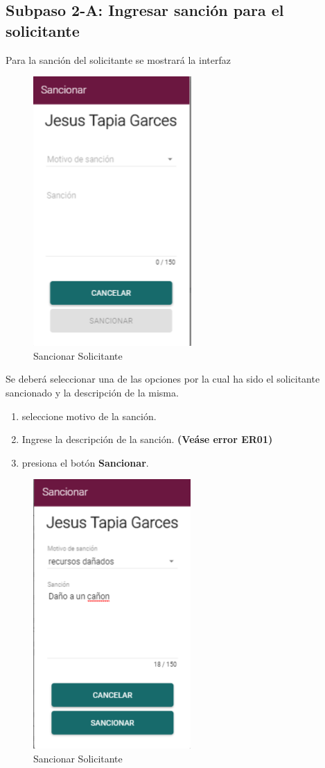 \subsection{Subpaso 2-A: Ingresar sanción para el solicitante}	
	Para la sanción del solicitante se mostrará la interfaz 
	
	\begin{figure}[hbtp]

	\includegraphics[scale=0.3]{images/InterfazMovil/IUGS07_sancionarSolicitante.PNG}
	\caption{Sancionar Solicitante}
	\end{figure}
	
	 Se	deberá seleccionar una de las opciones por la cual 
	ha sido el solicitante sancionado y la descripción 
	de la misma.	
	\begin{enumerate}
		\item seleccione motivo de la sanción.
		\item Ingrese la descripción de la sanción. \textbf{(Veáse error ER01)}
		\item presiona el botón \textbf{Sancionar}. 
	\end{enumerate}
		\begin{figure}[hbtp]

	\includegraphics[scale=0.3]{images/InterfazMovil/IUGS07_sancionarSolicitanteBoton.PNG}
	\caption{Sancionar Solicitante}
	\end{figure}
		
